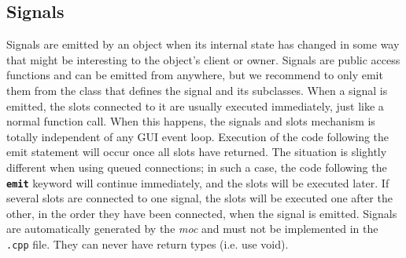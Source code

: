 \subsection{Signals}
\label{ssec:soft-signal}
Signals are emitted by an object when its internal state has changed in some way
that might be interesting to the object's client or owner. Signals are public
access functions and can be emitted from anywhere, but we recommend to only emit
them from the class that defines the signal and its subclasses.
%
When a signal is emitted, the slots connected to it are usually executed
immediately, just like a normal function call. When this happens, the signals
and slots mechanism is totally independent of any GUI event loop. Execution of
the code following the emit statement will occur once all slots have returned.
The situation is slightly different when using queued connections; in such a
case, the code following the \textbf{\texttt{emit}} keyword will continue
immediately, and the slots will be executed later.
%
If several slots are connected to one signal, the slots will be executed one
after the other, in the order they have been connected, when the signal is
emitted.
%
Signals are automatically generated by the \emph{moc} and must not be implemented in
the \texttt{.cpp} file. They can never have return types (i.e. use void).\cite{Qt:signal-slot}

